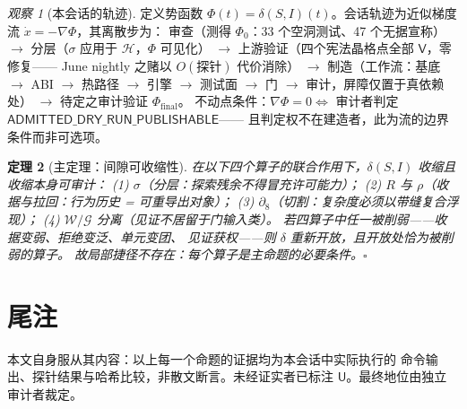 \documentclass[11pt]{article}
\newtheorem{thm}{定理}[section]
\theoremstyle{definition}
\theoremstyle{remark}
\newtheorem{obs}[thm]{观察}
\newcommand{\Hyp}{\mathcal{H}}
\newcommand{\strat}{\sigma}
\newcommand{\replay}{\rho}
\begin{document}
\begin{obs}[本会话的轨迹]
定义势函数 $\Phi(t) = \delta(S, I)(t)$。会话轨迹为近似梯度流
$\dot{x} = -\nabla \Phi$，其离散步为：
审查（测得 $\Phi_0$：33 个空洞测试、47 个无据宣称）
$\to$ 分层（$\strat$ 应用于 $\Hyp$，$\Phi$ 可见化）
$\to$ 上游验证（四个宪法晶格点全部 $\mathsf{V}$，零修复——
June nightly 之赌以 $O(\text{探针})$ 代价消除）
$\to$ 制造（工作流：基底 $\to$ ABI $\to$ 热路径 $\to$ 引擎 $\to$
测试面 $\to$ 门 $\to$ 审计，屏障仅置于真依赖处）
$\to$ 待定之审计验证 $\Phi_{\text{final}}$。
不动点条件：$\nabla \Phi = 0 \iff$ 审计者判定
$\mathsf{ADMITTED\_DRY\_RUN\_PUBLISHABLE}$——
且判定权不在建造者，此为流的边界条件而非可选项。
\end{obs}

\begin{thm}[主定理：间隙可收缩性]
在以下四个算子的联合作用下，$\delta(S,I)$ 收缩且收缩本身可审计：
(1) $\strat$（分层：探索残余不得冒充许可能力）；
(2) $R$ 与 $\replay$（收据与拉回：行为历史 = 可重导出对象）；
(3) $\partial_8$（切割：复杂度必须以带缝复合浮现）；
(4) $\mathcal{W}/\mathcal{G}$ 分离（见证不居留于门输入类）。
若四算子中任一被削弱——收据变弱、拒绝变泛、单元变团、
见证获权——则 $\delta$ 重新开放，且开放处恰为被削弱的算子。
故局部捷径不存在：每个算子是主命题的必要条件。$\square$
\end{thm}

\section*{尾注}

本文自身服从其内容：以上每一个命题的证据均为本会话中实际执行的
命令输出、探针结果与哈希比较，非散文断言。未经证实者已标注
$\mathsf{U}$。最终地位由独立审计者裁定。
\end{document}
